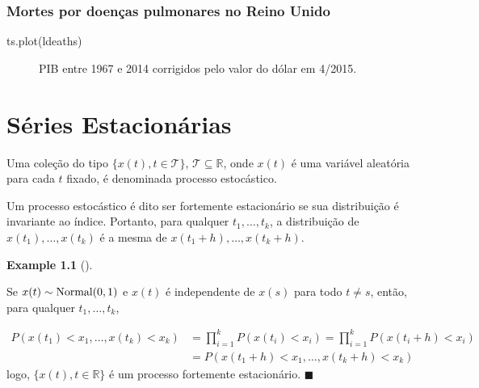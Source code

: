 \documentclass[
  letterpaper,
  DIV=11,
  numbers=noendperiod]{scrreprt}
\newenvironment{Shaded}{\begin{snugshade}}{\end{snugshade}}
\newcommand{\FunctionTok}[1]{\textcolor[rgb]{0.28,0.35,0.67}{#1}}
\newcommand{\NormalTok}[1]{\textcolor[rgb]{0.00,0.23,0.31}{#1}}
\theoremstyle{plain}
\theoremstyle{definition}
\newtheorem{example}{Example}[chapter]
\theoremstyle{definition}
\theoremstyle{remark}
\begin{document}
\hypertarget{mortes-por-doenuxe7as-pulmonares-no-reino-unido}{%
\subsection{Mortes por doenças pulmonares no Reino
Unido}\label{mortes-por-doenuxe7as-pulmonares-no-reino-unido}}

\begin{Shaded}
\begin{Highlighting}[]
\FunctionTok{ts.plot}\NormalTok{(ldeaths)}
\end{Highlighting}
\end{Shaded}

\begin{figure}

\begin{minipage}[t]{\linewidth}

{\centering 


\caption{PIB entre 1967 e 2014 corrigidos pelo valor do dólar em
4/2015.}

}

\end{minipage}%

\end{figure}


\hypertarget{suxe9ries-estacionuxe1rias}{%
\chapter{Séries Estacionárias}\label{suxe9ries-estacionuxe1rias}}

Uma coleção do tipo \(\{x(t),t\in\mathcal{T}\}\),
\(\mathcal{T}\subseteq \mathbb{R}\), onde \(x(t)\) é uma variável
aleatória para cada \(t\) fixado, é denominada processo estocástico.

Um processo estocástico é dito ser fortemente estacionário se sua
distribuição é invariante ao índice. Portanto, para qualquer
\(t_1,\ldots,t_k\), a distribuição de \(x(t_1),\ldots,x(t_k)\) é a mesma
de \(x(t_1+h),\ldots,x(t_k+h)\).

\begin{example}[]\protect\hypertarget{exm-serie_estacionaria_1}{}\label{exm-serie_estacionaria_1}

Se \(x(t)\sim \hbox{Normal}(0,1)\) e \(x(t)\) é independente de \(x(s)\)
para todo \(t\neq s\), então, para qualquer \(t_1,\ldots,t_k\),

\[\begin{align}P(x(t_1)<x_1,\ldots,x(t_k)<x_k)&=\prod_{i=1}^k P(x(t_i)<x_i)=\prod_{i=1}^k P(x(t_i+h)<x_i)\\&=P(x(t_1+h)<x_1,\ldots,x(t_k+h)<x_k)\end{align}\]
logo, \(\{x(t),t\in \mathbb{R}\}\) é um processo fortemente
estacionário. \(\blacksquare\)

\end{example}
\end{document}

